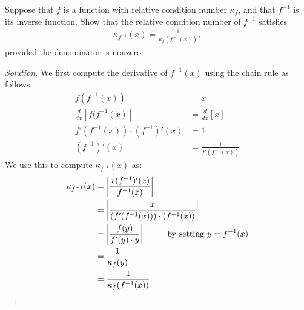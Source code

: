 \documentclass{article}
\DeclarePairedDelimiter{\abs}{\lvert}{\rvert}
\newenvironment{problem}[2][Problem]{\begin{trivlist}
\item[\hskip \labelsep {\bfseries #1}\hskip \labelsep {\bfseries #2.}]}{\end{trivlist}}
\theoremstyle{definition}
\begin{document}
\begin{problem}{1.2.5}
    Suppose that $f$ is a function with relative condition number $\kappa_f$, and that $f^{-1}$ is its inverse function. Show that the relative condition number of $f^{-1}$ satisfies 
    \begin{align}
        \kappa_{f^{-1}}(x) = \frac{1}{\kappa_f\left(f^{-1}(x)\right)},\tag{1.2.15}
    \end{align}
    provided the denominator is nonzero.
\end{problem}
\begin{proof}[Solution]
We first compute the derivative of $f^{-1}(x)$ using the chain rule as follows:
\begin{align*}
    f(f^{-1}(x)) &= x \\
    \frac{d}{dx}[f(f^{-1}(x)] &= \frac{d}{dx}[x] \\
    f'(f^{-1}(x)) \cdot (f^{-1})'(x) &= 1 \\
    (f^{-1})'(x) &= \frac{1}{f'(f^{-1}(x))}
\end{align*}
We use this to compute $\kappa_{f^{-1}}(x)$ as:
\begin{align*}
    \kappa_{f^{-1}}(x) &= \abs*{\frac{x(f^{-1})'(x)}{f^{-1}(x)}} \\
    &= \abs*{\frac{x}{(f'(f^{-1}(x))) \cdot (f^{-1}(x))}} \\
    &= \abs*{\frac{f(y)}{f'(y) \cdot y}} \hspace{1cm} \text{by setting $y = f^{-1}(x)$} \\
    &= \frac{1}{\kappa_f(y)} \\
    &= \frac{1}{\kappa_f(f^{-1}(x))}
\end{align*}
\end{proof}
\end{document}
